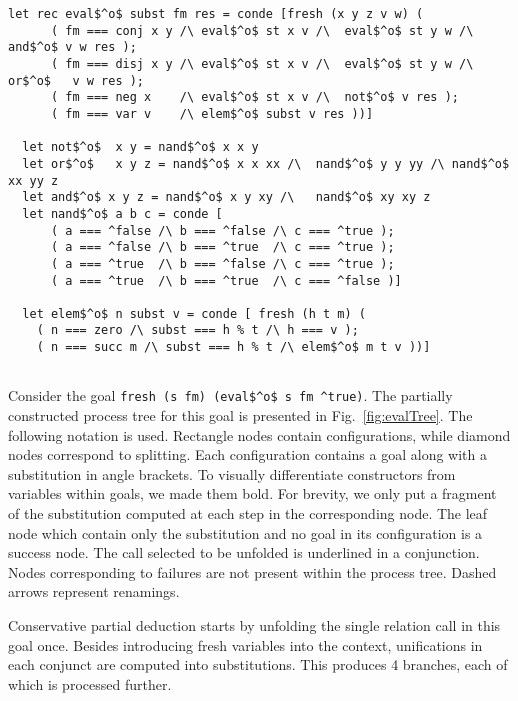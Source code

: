 \begin{figure*}[!t]
  \centering
  \begin{minipage}{0.95\textwidth}
    \begin{lstlisting}[label={eval:whole}, caption={Evaluator of propositional formulas}, captionpos=b, frame=tb]
  let rec eval$^o$ subst fm res = conde [fresh (x y z v w) (
      ( fm === conj x y /\ eval$^o$ st x v /\  eval$^o$ st y w /\  and$^o$ v w res );
      ( fm === disj x y /\ eval$^o$ st x v /\  eval$^o$ st y w /\  or$^o$   v w res );
      ( fm === neg x    /\ eval$^o$ st x v /\  not$^o$ v res );
      ( fm === var v    /\ elem$^o$ subst v res ))]

  let not$^o$  x y = nand$^o$ x x y
  let or$^o$   x y z = nand$^o$ x x xx /\  nand$^o$ y y yy /\ nand$^o$ xx yy z
  let and$^o$ x y z = nand$^o$ x y xy /\   nand$^o$ xy xy z
  let nand$^o$ a b c = conde [
      ( a === ^false /\ b === ^false /\ c === ^true );
      ( a === ^false /\ b === ^true  /\ c === ^true );
      ( a === ^true  /\ b === ^false /\ c === ^true );
      ( a === ^true  /\ b === ^true  /\ c === ^false )]

  let elem$^o$ n subst v = conde [ fresh (h t m) (
    ( n === zero /\ subst === h % t /\ h === v );
    ( n === succ m /\ subst === h % t /\ elem$^o$ m t v ))]


    \end{lstlisting}
  \end{minipage}
\end{figure*}

Consider the goal \lstinline{fresh (s fm) (eval$^o$ s fm ^true)}.
The partially constructed process tree for this goal is presented in Fig.~\ref{fig:evalTree}.
The following notation is used.
Rectangle nodes contain configurations, while diamond nodes correspond to splitting.
Each configuration contains a goal along with a substitution in angle brackets.
To visually differentiate constructors from variables within goals, we made them bold.
For brevity, we only put a fragment of the substitution computed at each step in the corresponding node.
The leaf node which contain only the substitution and no goal in its configuration is a success node.
The call selected to be unfolded is underlined in a conjunction.
Nodes corresponding to failures are not present within the process tree.
Dashed arrows represent renamings.

Conservative partial deduction starts by unfolding the single relation call in this goal once.
Besides introducing fresh variables into the context, unifications in each conjunct are computed into substitutions.
This produces 4 branches, each of which is processed further.

